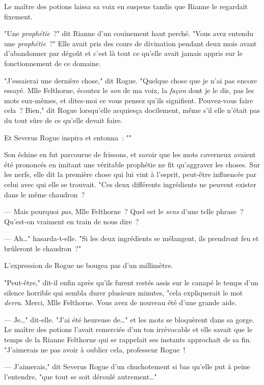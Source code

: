 Le maître des potions laissa sa voix en suspens tandis que Rianne le regardait fixement.

"Une \emph{prophétie}~?" dit Rianne d'un couinement haut perché. "Vous avez entendu une \emph{prophétie}~?" Elle avait pris des cours de divination pendant deux mois avant d'abandonner par dégoût et c'est là tout ce qu'elle avait jamais appris sur le fonctionnement de ce domaine.

"J'essaierai une dernière chose," dit Rogue. "Quelque chose que je n'ai pas encore essayé. Mlle Felthorne, écoutez le \emph{son} de ma voix, la \emph{façon} dont je le dis, pas les mots eux-mêmes, et dites-moi ce vous pensez qu'ils signifient. Pouvez-vous faire cela~? Bien," dit Rogue lorsqu'elle acquiesça docilement, même s'il elle n'était pas du tout sûre de ce qu'elle devait faire.

Et Severus Rogue inspira et entonna~: ""

Son échine en fut parcourue de frissons, et savoir que les mots caverneux avaient été prononcés en imitant une véritable prophétie ne fit qu'aggraver les choses. Sur les nerfs, elle dit la première chose qui lui vint à l'esprit, peut-être influencée par celui avec qui elle se trouvait. "Ces deux différents ingrédients ne peuvent exister dans le même chaudron~?

--- Mais pourquoi \emph{pas}, Mlle Felthorne~? Quel est le \emph{sens} d'une telle phrase~? Qu'est-on vraiment en train de nous dire~?

--- Ah…" hasarda-t-elle. "Si les deux ingrédients se mélangent, ils prendront feu et brûleront le chaudron~?"

L'expression de Rogue ne bougea pas d'un millimètre.

"Peut-être," dit-il enfin après qu'ils furent restés assis sur le canapé le temps d'un silence horrible qui sembla durer plusieurs minutes, "cela expliquerait le mot \emph{devra}. Merci, Mlle Felthorne. Vous avez de nouveau été d'une grande aide.

--- Je…" dit-elle. "J'ai été heureuse de…" et les mots se bloquèrent dans sa gorge. Le maître des potions l'avait remerciée d'un ton irrévocable et elle savait que le temps de la Rianne Felthorne qui se rappelait ses instants approchait de sa fin. "J'aimerais ne pas avoir à oublier cela, professeur Rogue~!

--- J'aimerais," dit Severus Rogue d'un chuchotement si bas qu'elle put à peine l'entendre, "que tout se soit déroulé autrement…"

